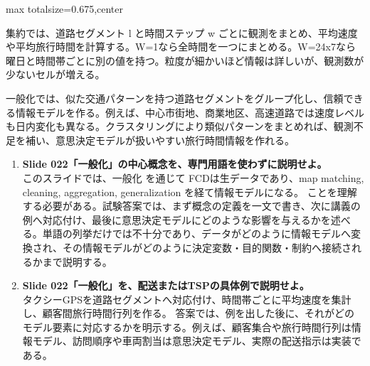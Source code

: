 \begin{adjustbox}{max totalsize={\textwidth}{0.675\textheight},center}
\begin{minipage}{\textwidth}
\begin{minipage}[t]{0.485\textwidth}
集約では、道路セグメント l と時間ステップ w ごとに観測をまとめ、平均速度や平均旅行時間を計算する。W=1なら全時間を一つにまとめる。W=24x7なら曜日と時間帯ごとに別の値を持つ。粒度が細かいほど情報は詳しいが、観測数が少ないセルが増える。\par
一般化では、似た交通パターンを持つ道路セグメントをグループ化し、信頼できる情報モデルを作る。例えば、中心市街地、商業地区、高速道路では速度レベルも日内変化も異なる。クラスタリングにより類似パターンをまとめれば、観測不足を補い、意思決定モデルが扱いやすい旅行時間情報を作れる。\par
{}
\begin{enumerate}
\item \textbf{Slide 022「一般化」の中心概念を、専門用語を使わずに説明せよ。}\\このスライドでは、一般化 を通じて FCDは生データであり、map matching, cleaning, aggregation, generalization を経て情報モデルになる。 ことを理解する必要がある。試験答案では、まず概念の定義を一文で書き、次に講義の例へ対応付け、最後に意思決定モデルにどのような影響を与えるかを述べる。単語の列挙だけでは不十分であり、データがどのように情報モデルへ変換され、その情報モデルがどのように決定変数・目的関数・制約へ接続されるかまで説明する。
\item \textbf{Slide 022「一般化」を、配送またはTSPの具体例で説明せよ。}\\タクシーGPSを道路セグメントへ対応付け、時間帯ごとに平均速度を集計し、顧客間旅行時間行列を作る。 答案では、例を出した後に、それがどのモデル要素に対応するかを明示する。例えば、顧客集合や旅行時間行列は情報モデル、訪問順序や車両割当は意思決定モデル、実際の配送指示は実装である。
\end{enumerate}
\end{minipage}
\end{minipage}
\end{adjustbox}

